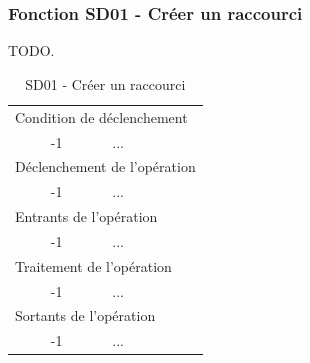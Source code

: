 \documentclass[a4paper]{article}
\begin{document}
\subsubsection{Fonction SD01 - Créer un raccourci}
TODO.\\
\begin{table}[H]
  \centering
   \small
	\begin{tabular}{|c|p{12cm}|}
   		\hline
   			\rowcolor{lightgray}\multicolumn{2}{|c|}{\textbf{SD01 - Créer un raccourci}} \\
   		\hline
   			\multicolumn{2}{|l|}{Condition de d\'eclenchement} \\
   		\hline
   			-1 & ...\\
   		\hline
   			\multicolumn{2}{|l|}{D\'eclenchement de l'op\'eration} \\
   		\hline
   			-1 & ...\\
   		\hline
   			\multicolumn{2}{|l|}{Entrants de l'op\'eration} \\
   		\hline
   			-1 & ...\\
   		\hline
   			\multicolumn{2}{|l|}{Traitement de l'op\'eration} \\
  		\hline
   			-1 & ...\\
   		\hline
   			\multicolumn{2}{|l|}{Sortants de l'op\'eration} \\
   		\hline
   			-1 & ...\\
   		\hline
	\end{tabular}
  \caption{SD01 - Créer un raccourci}
  \normalsize
  \label{tab:creer_raccourci}
\end{table}
\end{document}
